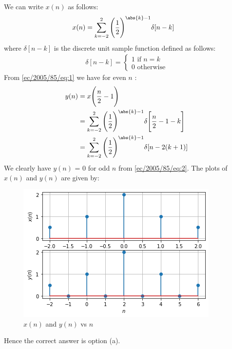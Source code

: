We can write $x(n)$ as follows:
\begin{align}
x(n) &= \sum_{k=-2}^{2}\Bigg(\frac{1}{2}\Bigg)^{\abs{k}-1}\delta[n-k]\label{ec/2005/85/eq:1}
\end{align}
where $\delta[n-k]$ is the discrete unit sample function defined as follows:
\begin{align}
\delta[n-k]=\begin{cases}
1 \text{ if } n=k\\
0 \text{ otherwise}
\end{cases}
\end{align}
From \eqref{ec/2005/85/eq:1} we have for even $n$ :
\begin{align}
y(n) &= x\Bigg(\dfrac{n}{2}-1\Bigg)\\
&= \sum_{k=-2}^{2}\Bigg(\frac{1}{2}\Bigg)^{\abs{k}-1}\delta\Bigg[\frac{n}{2}-1-k\Bigg]\\
&= \sum_{k=-2}^{2}\Bigg(\frac{1}{2}\Bigg)^{\abs{k}-1}\delta[n-2(k+1)]\label{ec/2005/85/eq:2}
\end{align}
We clearly have $y(n)$ = 0 for odd $n$ from \eqref{ec/2005/85/eq:2}. The plots of $x(n)$ and $y(n)$ are given by:
\begin{figure}[!ht]
    \centering
    \includegraphics[width=\columnwidth] {solutions/ec/2005/85/Figures/Gate_Assignment_3_Fig_6.png}
    \caption{$x(n)$ and $y(n)$ vs $n$}
    \label{ec/2005/85/x(n) and y(n)}
\end{figure}

Hence the correct answer is option (a).
